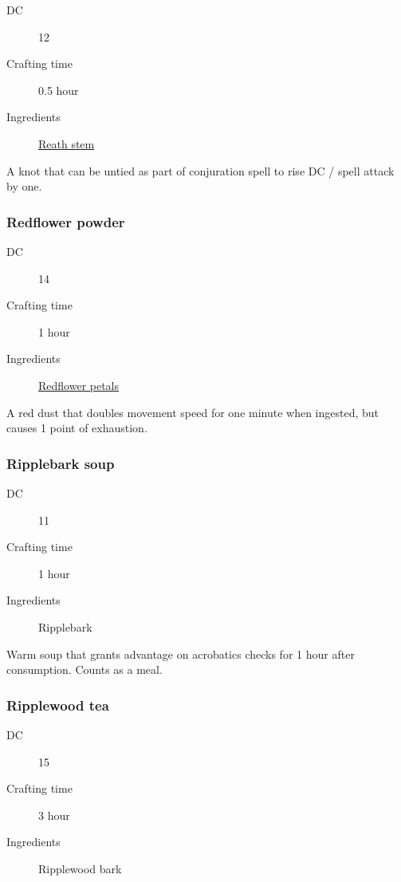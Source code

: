 \begin{description}
\item [DC] 12
\item [Crafting time] 0.5 hour
\item [Ingredients] \hyperref[Reath]{Reath stem}
\end{description}

A knot that can be untied as part of conjuration spell to rise DC / spell attack by one.

\subsubsection{Redflower powder}
\label{Redflower powder}

\begin{description}
\item [DC] 14
\item [Crafting time] 1 hour
\item [Ingredients] \hyperref[Redflower]{Redflower petals}
\end{description}

A red dust that doubles movement speed for one minute when ingested, but causes 1 point of exhaustion.

\subsubsection{Ripplebark soup}

\begin{description}
\item [DC] 11
\item [Crafting time] 1 hour
\item [Ingredients] Ripplebark
\end{description}

Warm soup that grants advantage on acrobatics checks for 1 hour after consumption. Counts as a meal.

\subsubsection{Ripplewood tea}
\label{Ripplewood tea}

\begin{description}
\item [DC] 15
\item [Crafting time] 3 hour
\item [Ingredients] Ripplewood bark
\end{description}

